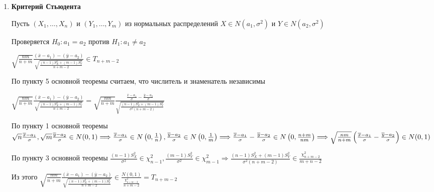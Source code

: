 \begin{enumerate}[label*=\Roman*. ]
    \item \textbf{Критерий Стьюдента}

    Пусть $(X_1, \dots, X_n)$ и $(Y_1, \dots, Y_m)$ из нормальных распределений $X \in N(a_1, \sigma^2)$ и $Y \in N(a_2, \sigma^2)$

    Проверяется $H_0 : a_1 = a_2$ против $H_1 : a_1 \neq a_2$

    \begin{MyTheorem}
        \Ths $\sqrt{\frac{nm}{n + m}} \frac{(\overline x - a_1) - (\overline y - a_2)}{\sqrt{\frac{(n - 1) S_X^2 + (m - 1) S^2_Y}{n + m - 2}}} \in T_{n + m - 2}$
    \end{MyTheorem}

    \begin{MyProof}
        По пункту 5 основной теоремы считаем, что числитель и знаменатель независимы 

        $\sqrt{\frac{nm}{n + m}} \frac{(\overline x - a_1) - (\overline y - a_2)}{\sqrt{\frac{(n - 1) S_X^2 + (m - 1) S^2_Y}{n + m - 2}}} = 
        \sqrt{\frac{nm}{n + m}} \frac{\frac{\overline x - a_1}{\sigma} - \frac{\overline y - a_2}{\sigma}}{\sqrt{\frac{(n - 1) S_X^2 + (m - 1) S^2_Y}{\sigma^2 (n + m - 2)}}}$

        По пункту 1 основной теоремы $\sqrt{n} \frac{\overline x - a_1}{\sigma}, \sqrt{m} \frac{\overline y - a_2}{\sigma} \in N(0, 1) \Longrightarrow \\
        \frac{\overline x - a_1}{\sigma} \in N\left(0, \frac{1}{n}\right), \frac{\overline y - a_2}{\sigma} \in N\left(0, \frac{1}{m}\right) \Longrightarrow \\
        \frac{\overline x - a_1}{\sigma} - \frac{\overline y - a_2}{\sigma} \in N\left(0, \frac{n + m}{nm}\right) \Longrightarrow \\
        \sqrt{\frac{nm}{n + m}} \left(\frac{\overline x - a_1}{\sigma} - \frac{\overline y - a_2}{\sigma}\right) \in N(0, 1)$

        По пункту 3 основной теоремы $\frac{(n - 1)S^2_X}{\sigma^2} \in \chi^2_{n - 1}, \frac{(m - 1)S^2_Y}{\sigma^2} \in \chi^2_{m - 1} \Longrightarrow
        \frac{(n - 1) S_X^2 + (m - 1) S^2_Y}{\sigma^2 (n + m - 2)} \in \frac{\chi^2_{n + m - 2}}{m + n - 2}$

        Из этого $\sqrt{\frac{nm}{n + m}} \frac{(\overline x - a_1) - (\overline y - a_2)}{\sqrt{\frac{(n - 1) S_X^2 + (m - 1) S^2_Y}{n + m - 2}}} \in \frac{N(0, 1)}{\frac{\chi^2_{n + m - 2}}{n + m - 2}} = T_{n + m - 2}$
    \end{MyProof}


\end{enumerate}
